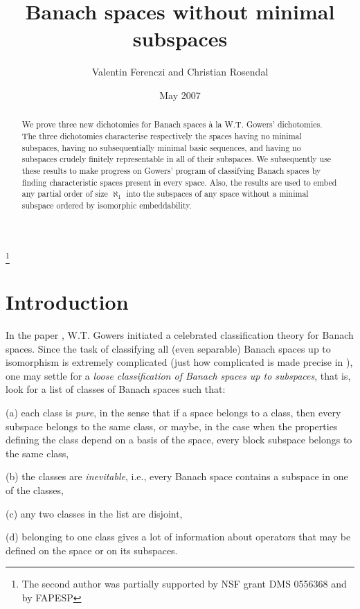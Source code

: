 \documentclass[10pt]{amsart}
\title{Banach spaces without minimal subspaces}
\author {Valentin Ferenczi and Christian Rosendal}
\date {May 2007}
\numberwithin{equation}{section}
\begin{document}
\thanks{The  second author was partially supported by NSF grant DMS 0556368 and by FAPESP}


\begin{abstract}
We prove three new dichotomies for Banach spaces \`a la W.T. Gowers'
dichotomies. The three dichotomies characterise respectively the spaces having
no minimal subspaces, having no subsequentially minimal basic sequences, and
having no subspaces crudely finitely representable in all of their subspaces.
We subsequently use these results to make progress on Gowers' program of
classifying Banach spaces by finding characteristic spaces present in every
space. Also, the results are used to embed any partial order of size $\aleph_1$
into the subspaces of any space without a minimal subspace ordered by
isomorphic embeddability.
\end{abstract}

 \maketitle

\tableofcontents

\section{Introduction}\label{intro}
In the paper \cite{g:dicho}, W.T. Gowers initiated a celebrated classification
theory for Banach spaces. Since the task of classifying all (even separable)
Banach spaces up to isomorphism is extremely complicated (just how complicated
is made precise in \cite{flr}), one may settle for a {\em loose classification
of Banach spaces up to subspaces}, that is, look for a list of classes of
Banach spaces such that:

(a) each class is {\em pure}, in the sense that if a space belongs to a class,
then every subspace belongs to the same class, or maybe, in the case when the
properties defining the class depend on a basis of the space, every block
subspace belongs to the same class,

(b) the classes are {\em inevitable}, i.e., every Banach space contains a subspace in one of the classes,

(c) any two classes in the list are disjoint,

(d) belonging to one class gives a lot of information about operators that may be defined on the space or on its subspaces.
\end{document}
